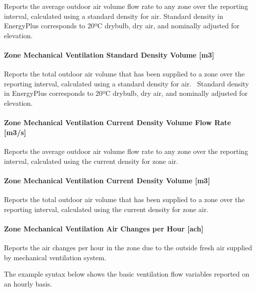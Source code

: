 Reports the average outdoor air volume flow rate to any zone over the reporting interval, calculated using a standard density for air. Standard density in EnergyPlus corresponds to 20ºC drybulb, dry air, and nominally adjusted for elevation.

\paragraph{Zone Mechanical Ventilation Standard Density Volume {[}m3{]}}\label{zone-mechanical-ventilation-standard-density-volume-m3}

Reports the total outdoor air volume that has been supplied to a zone over the reporting interval, calculated using a standard density for air.~ Standard density in EnergyPlus corresponds to 20ºC drybulb, dry air, and nominally adjusted for elevation.

\paragraph{Zone Mechanical Ventilation Current Density Volume Flow Rate {[}m3/s{]}}\label{zone-mechanical-ventilation-current-density-volume-flow-rate-m3s}

Reports the average outdoor air volume flow rate to any zone over the reporting interval, calculated using the current density for zone air.

\paragraph{Zone Mechanical Ventilation Current Density Volume {[}m3{]}}\label{zone-mechanical-ventilation-current-density-volume-m3}

Reports the total outdoor air volume that has been supplied to a zone over the reporting interval, calculated using the current density for zone air.

\paragraph{Zone Mechanical Ventilation Air Changes per Hour {[}ach{]}}\label{zone-mechanical-ventilation-air-changes-per-hour-ach}

Reports the air changes per hour in the zone due to the outside fresh air supplied by mechanical ventilation system.

The example syntax below shows the basic ventilation flow variables reported on an hourly basis.

